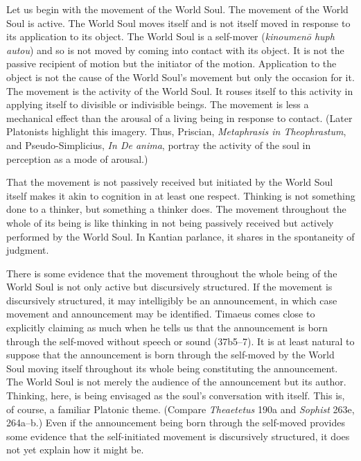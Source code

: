 Let us begin with the movement of the World Soul. The movement of the World Soul is active. The World Soul moves itself and is not itself moved in response to its application to its object. The World Soul is a self-mover (\emph{kinoumenō huph autou}) and so is not moved by coming into contact with its object. It is not the passive recipient of motion but the initiator of the motion. Application to the object is not the cause of the World Soul's movement but only the occasion for it. The movement is the activity of the World Soul. It rouses itself to this activity in applying itself to divisible or indivisible beings. The movement is less a mechanical effect than the arousal of a living being in response to contact. (Later Platonists highlight this imagery. Thus, Priscian, \emph{Metaphrasis in Theophrastum}, and Pseudo-Simplicius, \emph{In De anima}, portray the activity of the soul in perception as a mode of arousal.)

That the movement is not passively received but initiated by the World Soul itself makes it akin to cognition in at least one respect. Thinking is not something done to a thinker, but something a thinker does. The movement throughout the whole of its being is like thinking in not being passively received but actively performed by the World Soul. In Kantian parlance, it shares in the spontaneity of judgment.

There is some evidence that the movement throughout the whole being of the World Soul is not only active but discursively structured. If the movement is discursively structured, it may intelligibly be an announcement, in which case movement and announcement may be identified. Timaeus comes close to explicitly claiming as much when he tells us that the announcement is born through the self-moved without speech or sound (37b5--7). It is at least natural to suppose that the announcement is born through the self-moved by the World Soul moving itself throughout its whole being constituting the announcement. The World Soul is not merely the audience of the announcement but its author. Thinking, here, is being envisaged as the soul's conversation with itself. This is, of course, a familiar Platonic theme. (Compare \emph{Theaetetus} 190a and \emph{Sophist} 263e, 264a--b.) Even if the announcement being born through the self-moved provides some evidence that the self-initiated movement is discursively structured, it does not yet explain how it might be.

